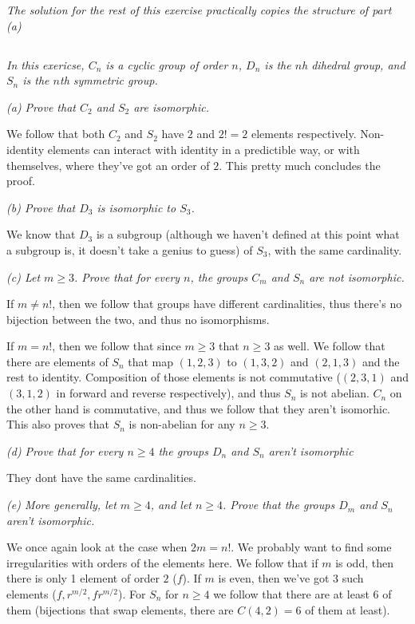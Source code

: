 \documentclass[11pt,oneside,titlepage]{book}
\begin{document}
\textit{The solution for the rest of this exercise practically copies
  the structure of part (a) }

\subsection{}

\textit{In this exericse, $C_n$ is a cyclic group of order $n$, $D_n$
  is the $n$h dihedral group, and $S_n$ is the $n$th symmetric group.}

\textit{(a) Prove that $C_2$ and $S_2$ are isomorphic.}

We follow that both $C_2$ and $S_2$ have $2$ and $2! = 2$ elements
respectively. Non-identity elements can interact with identity in a
predictible way, or with themselves, where they've got an order of
$2$. This pretty much concludes the proof.

\textit{(b) Prove that $D_3$ is isomorphic to $S_3$.}

We know that $D_3$ is a subgroup (although we haven't defined at this
point what a subgroup is, it doesn't take a genius to guess) of $S_3$,
with the same cardinality.

\textit{(c) Let $m \geq 3$. Prove that for every $n$, the groups $C_m$ and $S_n$ are not
  isomorphic.}

If $m \neq n!$, then we follow that groups have different cardinalities, thus
there's no bijection between the two, and thus no isomorphisms.

If $m = n!$, then we follow that since $m \geq 3$ that $n \geq 3$ as
well.  We follow that there are elements of $S_n$ that map $(1, 2, 3)$
to $(1, 3, 2)$ and $(2, 1, 3)$ and the rest to identity. Composition
of those elements is not commutative ($(2, 3, 1)$ and $(3, 1, 2)$ in
forward and reverse respectively), and thus $S_n$ is not abelian.
$C_n$ on the other hand is commutative, and thus we follow
that they aren't isomorhic. This also proves that $S_n$ is non-abelian
for any $n \geq 3$.

\textit{(d) Prove that for every $n \geq 4$ the groups $D_n$ and $S_n$
  aren't isomorphic}

They dont have the same cardinalities.

\textit{(e) More generally, let $m \geq 4$, and let $n \geq 4$. Prove
  that the groups $D_m$ and $S_n$ aren't isomorphic.}

We once again look at the case when $2m = n!$. We probably want to
find some irregularities with orders of the elements here.  We follow
that if $m$ is odd, then there is only 1 element of order $2$ ($f$).
If $m$ is even, then we've got 3 such elements ($f, r^{m/2}, fr^{m/2}$).
For $S_n$ for $n \geq 4$ we follow that there are at least 6 of them
(bijections that swap elements, there are $C(4, 2) = 6$ of them at least).
\end{document}

